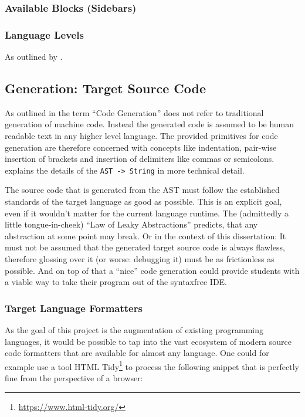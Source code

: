 \subsubsection{Available Blocks (Sidebars)}

\subsubsection{Language Levels}

As outlined by \cite{klaeren_macht_2007}.

\subsection{Generation: Target Source Code}

As outlined in  the term \enquote{Code Generation} does not refer to traditional generation of machine code. Instead the generated code is assumed to be human readable text in any higher level language. The provided primitives for code generation are therefore concerned with concepts like indentation, pair-wise insertion of brackets and insertion of delimiters like commas or semicolons.  explains the details of the \texttt{AST -> String} in more technical detail.

The source code that is generated from the AST must follow the established standards of the target language as good as possible. This is an explicit goal, even if it wouldn't matter for the current language runtime. The (admittedly a little tongue-in-cheek) \enquote{Law of Leaky Abstractions} \cite{spolsky_law_2002} predicts, that any abstraction at some point may break. Or in the context of this dissertation: It must not be assumed that the generated target source code is always flawless, therefore glossing over it (or worse: debugging it) must be as frictionless as possible. And on top of that a \enquote{nice} code generation could provide students with a viable way to take their program out of the syntaxfree IDE.

\subsubsection{Target Language Formatters}

As the goal of this project is the augmentation of existing programming languages, it would be possible to tap into the vast ecosystem of modern source code formatters that are available for almost any language. One could for example use a tool HTML Tidy\footnote{\url{https://www.html-tidy.org/}} to process the following snippet that is perfectly fine from the perspective of a browser:

